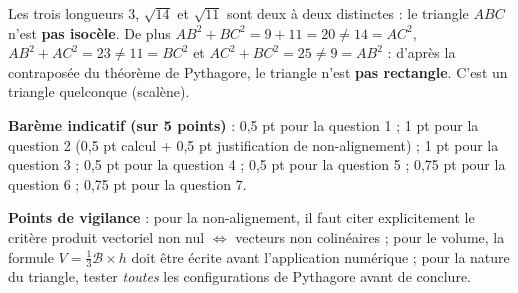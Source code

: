 \documentclass[11pt]{article}
\begin{document}
\begin{corrige}
\begin{enumerate}
Les trois longueurs $3$, $\sqrt{14}$ et $\sqrt{11}$ sont deux à deux distinctes : le triangle $ABC$ n'est \textbf{pas isocèle}. De plus $AB^2 + BC^2 = 9 + 11 = 20 \neq 14 = AC^2$, $AB^2 + AC^2 = 23 \neq 11 = BC^2$ et $AC^2 + BC^2 = 25 \neq 9 = AB^2$ : d'après la contraposée du théorème de Pythagore, le triangle n'est \textbf{pas rectangle}. C'est un triangle quelconque (scalène).
\end{enumerate}
\textbf{Barème indicatif (sur 5 points)} : 0,5 pt pour la question 1 ; 1 pt pour la question 2 (0,5 pt calcul + 0,5 pt justification de non-alignement) ; 1 pt pour la question 3 ; 0,5 pt pour la question 4 ; 0,5 pt pour la question 5 ; 0,75 pt pour la question 6 ; 0,75 pt pour la question 7.

\textbf{Points de vigilance} : pour la non-alignement, il faut citer explicitement le critère \og produit vectoriel non nul $\iff$ vecteurs non colinéaires \fg{} ; pour le volume, la formule $V = \frac{1}{3}\mathcal{B}\times h$ doit être écrite avant l'application numérique ; pour la nature du triangle, tester \emph{toutes} les configurations de Pythagore avant de conclure.
\end{corrige}
\end{document}
